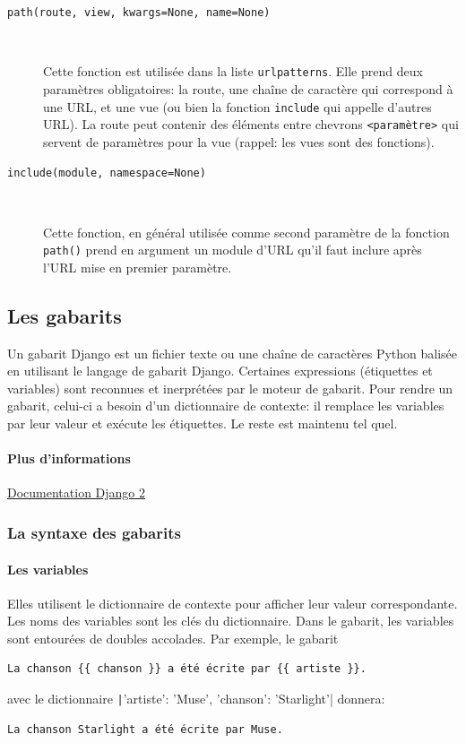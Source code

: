 \documentclass[a4paper, 10pt]{article}
\begin{document}
\begin{description}
    \item[\texttt{path(route, view, kwargs=None, name=None)}]~

          Cette fonction est utilisée dans la liste \texttt{urlpatterns}. Elle prend deux paramètres obligatoires: la route, une chaîne de caractère qui correspond à une URL, et une vue (ou bien la fonction \texttt{include} qui appelle d'autres URL). La route peut contenir des éléments entre chevrons \texttt{<paramètre>} qui servent de paramètres pour la vue (rappel: les vues sont des fonctions).

    \item[\texttt{include(module, namespace=None)}]~

          Cette fonction, en général utilisée comme second paramètre de la fonction \texttt{path()} prend en argument un module d'URL qu'il faut inclure après l'URL mise en premier paramètre.
\end{description}


\subsection{Les gabarits}
Un gabarit Django est un fichier texte ou une chaîne de caractères Python balisée en utilisant le langage de gabarit Django. Certaines expressions (étiquettes et variables) sont reconnues et inerprétées par le moteur de gabarit. Pour rendre un gabarit, celui-ci a besoin d'un dictionnaire de contexte: il remplace les variables par leur valeur et exécute les étiquettes. Le reste est maintenu tel quel.

\paragraph{Plus d'informations} \href{https://docs.djangoproject.com/fr/2.0/topics/templates/}{Documentation Django 2}


\subsubsection{La syntaxe des gabarits}
\paragraph{Les variables}
Elles utilisent le dictionnaire de contexte pour afficher leur valeur correspondante. Les noms des variables sont les clés du dictionnaire. Dans le gabarit, les variables sont entourées de doubles accolades. Par exemple, le gabarit
\begin{verbatim}
La chanson {{ chanson }} a été écrite par {{ artiste }}.
\end{verbatim}
avec le dictionnaire \texttt|{{'artiste': 'Muse', 'chanson': 'Starlight'}}| donnera:
\begin{verbatim}
La chanson Starlight a été écrite par Muse.
\end{verbatim}
\end{document}
